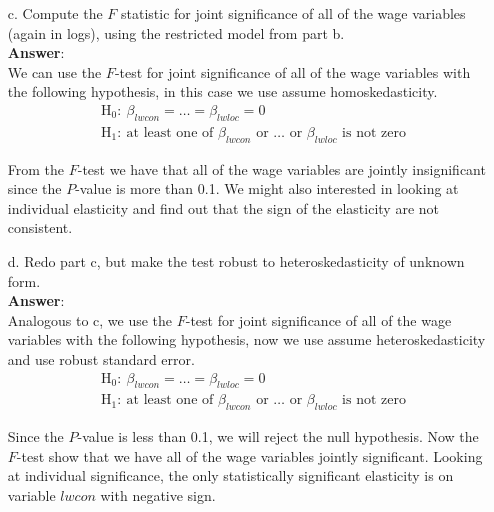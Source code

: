 \documentclass[10pt]{article}
\begin{document}
\begin{enumerate}
\item[c.] Compute the $F$ statistic for joint significance of all of the wage variables (again in logs), using the restricted model from part b.
\\ \textbf{Answer}:\\
We can use the $F$-test for joint significance of all of the wage variables with the following hypothesis, in this case we use assume homoskedasticity.
\begin{align*}
    &\text{H}_0:\ \beta_{lwcon}=\ldots=\beta_{lwloc}=0\\
    &\text{H}_1:\ \text{at least one of }\beta_{lwcon}\text{ or }\ldots\text{ or }\beta_{lwloc} \text{ is not zero}
\end{align*}

From the $F$-test we have that all of the wage variables are jointly insignificant since the $P$-value is more than 0.1. We might also interested in looking at individual elasticity and find out that the sign of the elasticity are not consistent. 

\item[d.] Redo part c, but make the test robust to heteroskedasticity of unknown form.
\\ \textbf{Answer}:\\
Analogous to c, we use the $F$-test for joint significance of all of the wage variables with the following hypothesis, now we use assume heteroskedasticity and use robust standard error.
\begin{align*}
    &\text{H}_0:\ \beta_{lwcon}=\ldots=\beta_{lwloc}=0\\
    &\text{H}_1:\ \text{at least one of }\beta_{lwcon}\text{ or }\ldots\text{ or }\beta_{lwloc} \text{ is not zero}
\end{align*}

Since the $P$-value is less than 0.1, we will reject the null hypothesis. Now the $F$-test show that we have all of the wage variables jointly significant. Looking at individual significance, the only statistically significant elasticity is on variable $lwcon$ with negative sign.
\end{enumerate}
\end{document}
